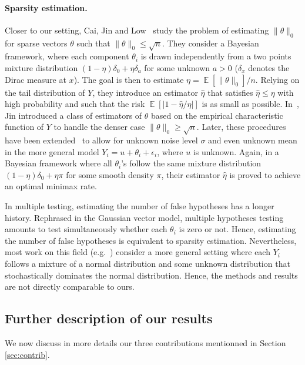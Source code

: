 \documentclass[twoside,11pt]{article}
\newcommand{\E}{\operatorname{\mathbb{E}}}
\newcommand{\<}{\langle}
\renewcommand{\>}{\rangle}
\begin{document}
\paragraph{Sparsity estimation.} Closer to our setting, Cai, Jin and Low~\cite{MR2382653} study the problem of estimating $\|\theta\|_0$ for sparse vectors $\theta$ such that $\|\theta\|_0\leq \sqrt{n}$. They consider a Bayesian framework, where each component $\theta_i$ is drawn independently from a two points mixture distribution $(1-\eta)\delta_0+ \eta\delta_a$ for some unknown $a>0$ ($\delta_x$ denotes the Dirac measure at $x$). The goal is then to estimate $\eta= \E[\|\theta\|_0]/n$. Relying on the tail distribution of $Y$, they introduce an estimator $\widehat{\eta}$ that satisfies $\widehat{\eta}\leq \eta$ with high probability and such that the risk $\E[|1- \widehat{\eta}/\eta|]$ is as small as possible. In~\cite{MR2420411}, Jin introduced a class of estimators of $\theta$ based on the empirical characteristic function of $Y$ to handle the denser case $\|\theta\|_0\geq \sqrt{n}$. Later, these procedures have been extended~\cite{MR2325113,MR2589318} to allow for unknown noise level $\sigma$ and even unknown mean in the more general model $Y_i=u+\theta_i+\epsilon_i$, where $u$ is unknown. Again, in a Bayesian framework where all $\theta_i$'s follow the same mixture distribution $(1-\eta)\delta_0+ \eta \pi$ for some smooth density $\pi$, their estimator $\widehat{\eta}$ is proved to achieve an optimal minimax rate. 

In multiple testing, estimating the number of false hypotheses has a longer history. Rephrased in the Gaussian vector model, multiple hypotheses testing amounts to test simultaneously whether each $\theta_i$ is zero or not. Hence, estimating the number of false hypotheses is equivalent to sparsity estimation. Nevertheless, most work on this field (e.g.\  \cite{patra2015estimation,meinshausen2006estimating,storey2002direct,celisse2010cross,langaas2005estimating}) consider a more general setting where each $Y_i$ follows a mixture of a normal distribution and some unknown distribution that stochastically dominates the normal distribution. Hence, the methods and results are not directly comparable to ours. 




\subsection{Further description of our results}
We now discuss in more details our three contributions mentionned in Section \ref{sec:contrib}. 
\end{document}
